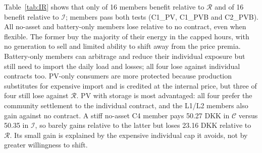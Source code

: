 \documentclass[10pt,a4paper]{article}
\newcommand{\Rmod}{\mathcal R}
\newcommand{\Imod}{\mathcal I}
\newcommand{\Cmod}{\mathcal C}
\begin{document}
\begin{table}[!htbp]
    \centering\small
    \caption{Member-by-member costs and gains under the base dual settlement (DKK/day). Bold positive gains pass IR; negative gains fail. Suffix B denotes battery, PV denotes a PV system, and PVB denotes both.}
    \label{tab:IR}
    
\end{table}
Table~\ref{tab:IR} shows that only \IRR{} of 16 members benefit relative to $\Rmod$ and \IRI{} of 16 benefit relative to $\Imod$; \IRBoth{} members pass both tests (C1\_PV, C1\_PVB and C2\_PVB). All no-asset and battery-only members lose relative to no contract, even when flexible. The former buy the majority of their energy in the capped hours, with no generation to sell and limited ability to shift away from the price premia. Battery-only members can arbitrage and reduce their individual exposure but still need to import the daily load and losses; all four lose against individual contracts too. PV-only consumers are more protected because production substitutes for expensive import and is credited at the internal price, but three of four still lose against $\Rmod$. PV with storage is most advantaged: all four prefer the community settlement to the individual contract, and the L1/L2 members also gain against no contract. A stiff no-asset C4 member pays 50.27 DKK in $\Cmod$ versus 50.35 in $\Imod$, so barely gains relative to the latter but loses 23.16 DKK relative to $\Rmod$. Its small gain is explained by the expensive individual cap it avoids, not by greater willingness to shift.
\FloatBarrier
\end{document}
